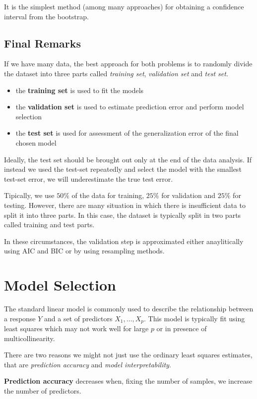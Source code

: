 It is the simplest method (among many approaches) for obtaining a confidence interval from the bootstrap.

\subsection*{Final Remarks}
If we have many data, the best approach for both problems is to randomly divide the dataset into three parts called \textit{training set}, \textit{validation set} and \textit{test set}.

\begin{itemize}
    \item the \textbf{training set} is used to fit the models
    \item the \textbf{validation set} is used to estimate prediction error and perform model selection
    \item the \textbf{test set} is used for assessment of the generalization error of the final chosen model
\end{itemize}

Ideally, the test set should be brought out only at the end of the data analysis. If instead we used the test-set repeatedly and select the model with the smallest test-set error, we will underestimate the true test error.

Tipically, we use $50\%$ of the data for training, $25\%$ for validation and $25\%$ for testing. However, there are many situation in which there is insufficient data to split it into three parts. In this case, the dataset is typically split in two parts called training and test parts.

In these circumstances, the validation step is approximated either anaylitically using AIC and BIC or by using resampling methods.

\section{Model Selection}
The standard linear model is commonly used to describe the relationship between a response $Y$ and a set of predictors $X_1, \dots, X_p$. This model is typically fit using least squares which may not work well for large $p$ or in presence of multicollinearity.

There are two reasons we might not just use the ordinary least squares estimates, that are \textit{prediction accuracy} and \textit{model interpretability}.

\textbf{Prediction accuracy} decreases when, fixing the number of samples, we increase the number of predictors.

